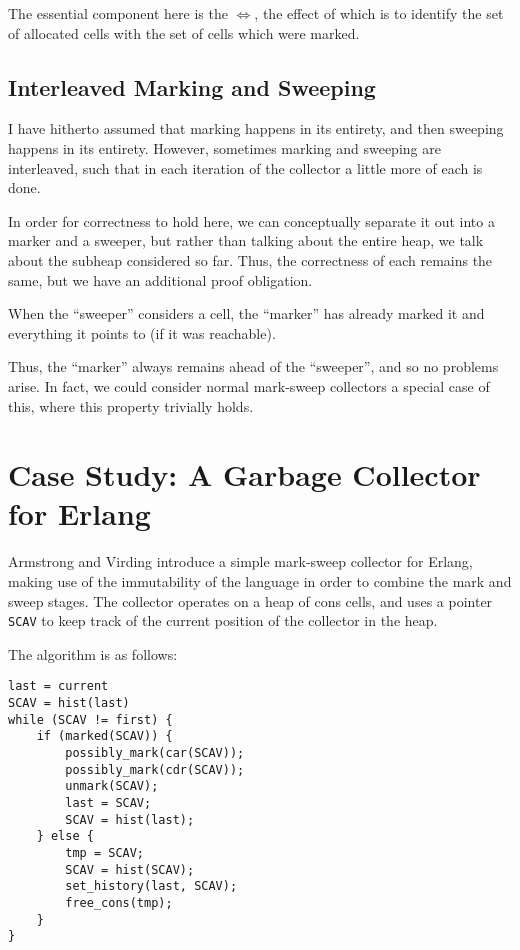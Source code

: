 The essential component here is the $\iff$, the effect of which is to
identify the set of allocated cells with the set of cells which were
marked.

\subsection{Interleaved Marking and Sweeping}
\label{sec:marksweep-sweeping-interleaved}

I have hitherto assumed that marking happens in its entirety, and then
sweeping happens in its entirety. However, sometimes marking and
sweeping are interleaved, such that in each iteration of the collector
a little more of each is done.

In order for correctness to hold here, we can conceptually separate it
out into a marker and a sweeper, but rather than talking about the
entire heap, we talk about the subheap considered so far. Thus, the
correctness of each remains the same, but we have an additional proof
obligation.

\begin{definition}
  \label{def:ms-interleaved}
  When the ``sweeper'' considers a cell, the ``marker'' has already
  marked it and everything it points to (if it was reachable).
\end{definition}

Thus, the ``marker'' always remains ahead of the ``sweeper'', and so
no problems arise. In fact, we could consider normal \gls{mark-sweep}
\glspl{collector} a special case of this, where this property
trivially holds.

\section{Case Study: A Garbage Collector for Erlang}
\label{sec:marksweep-example}

Armstrong and Virding\cite{Armstrong95} introduce a simple
\gls{mark-sweep} \gls{collector} for Erlang, making use of the
immutability of the language in order to combine the mark and sweep
stages. The \gls{collector} operates on a \gls{heap} of cons cells,
and uses a \gls{pointer} \texttt{SCAV} to keep track of the current
position of the \gls{collector} in the heap.

The algorithm is as follows:

\begin{lstlisting}
last = current
SCAV = hist(last)
while (SCAV != first) {
    if (marked(SCAV)) {
        possibly_mark(car(SCAV));
        possibly_mark(cdr(SCAV));
        unmark(SCAV);
        last = SCAV;
        SCAV = hist(last);
    } else {
        tmp = SCAV;
        SCAV = hist(SCAV);
        set_history(last, SCAV);
        free_cons(tmp);
    }
}
\end{lstlisting}

